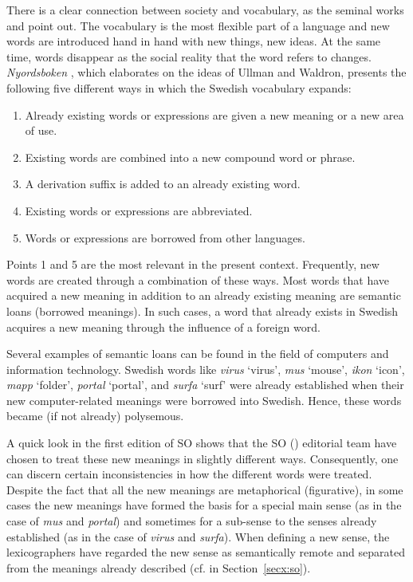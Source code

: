 \documentclass[output=paper]{langscibook}
\begin{document}
There is a clear connection between society and vocabulary, as the seminal works \citet{ullman1962} and \citet{waldron1967} point out. The vocabulary is the most flexible part of a language and new words are introduced hand in hand with new things, new ideas. At the same time, words disappear as the social reality that the word refers to changes. \emph{Nyordsboken} \citep[11--12]{nyordsboken}, which elaborates on the ideas of Ullman and Waldron, presents the following five different ways in which the Swedish vocabulary expands:
\begin{enumerate}
\item Already existing words or expressions are given a new meaning or a new area of use.
\item Existing words are combined into a new compound word or phrase. 
\item A derivation suffix is added to an already existing word.
\item Existing words or expressions are abbreviated.
\item Words or expressions are borrowed from other languages.
\end{enumerate}
Points 1 and 5 are the most relevant in the present context. Frequently, new words are created through a combination of these ways. Most words that have acquired a new meaning in addition to an already existing meaning are semantic loans (borrowed meanings). In such cases, a word that already exists in Swedish acquires a new meaning through the influence of a foreign word. 

Several examples of semantic loans can be found in the field of computers and information technology. Swedish words like \emph{virus} `virus', \emph{mus} `mouse', \emph{ikon} `icon', \emph{mapp} `folder', \emph{portal} `portal', and \emph{surfa} `surf' were already established when their new computer-related meanings were borrowed into Swedish. Hence, these words became (if not already) polysemous.

A quick look in the first edition of SO shows that the SO (\citeyear{SO2009}) editorial team have chosen to treat these  new meanings in slightly different ways. Consequently, one can discern certain inconsistencies in how the different words were treated. Despite the fact that all the new meanings are metaphorical (figurative), in some cases the new meanings have formed the basis for a special main sense (as in the case of \emph{mus} and \emph{portal}) and sometimes for a sub-sense to the senses already established (as in the case of \emph{virus} and \emph{surfa}). When defining a new sense, the lexicographers have regarded the new sense as semantically remote and separated from the meanings already described (cf. \citealt{svensen2009} in Section~\ref{secx:so}).
\end{document}
